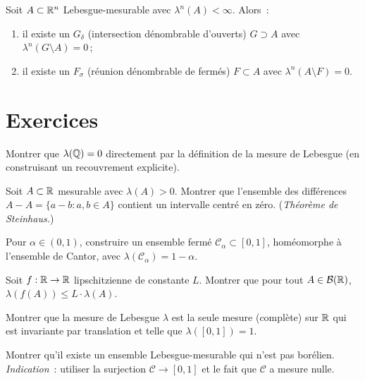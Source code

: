 \begin{theoreme}
Soit $A \subset \mathbb{R}^n$ Lebesgue-mesurable avec $\lambda^n(A) < \infty$. Alors~:
\begin{enumerate}
    \item il existe un $G_\delta$ (intersection d\'enombrable d'ouverts) $G \supset A$
    avec $\lambda^n(G \setminus A) = 0$\,;
    \item il existe un $F_\sigma$ (r\'eunion d\'enombrable de ferm\'es) $F \subset A$
    avec $\lambda^n(A \setminus F) = 0$.
\end{enumerate}
\end{theoreme}

\section{Exercices}

\begin{exercice}
Montrer que $\lambda(\mathbb{Q}) = 0$ directement par la d\'efinition de la mesure de
Lebesgue (en construisant un recouvrement explicite).
\end{exercice}

\begin{exercice}
Soit $A \subset \mathbb{R}$ mesurable avec $\lambda(A) > 0$. Montrer que l'ensemble des
diff\'erences $A - A = \{a - b : a, b \in A\}$ contient un intervalle centr\'e en
z\'ero. (\emph{Th\'eor\`eme de Steinhaus.})
\end{exercice}

\begin{exercice}
Pour $\alpha \in (0, 1)$, construire un ensemble ferm\'e $\mathcal{C}_\alpha
\subset [0, 1]$, hom\'eomorphe \`a l'ensemble de Cantor, avec
$\lambda(\mathcal{C}_\alpha) = 1 - \alpha$.
\end{exercice}

\begin{exercice}
Soit $f : \mathbb{R} \to \mathbb{R}$ lipschitzienne de constante $L$. Montrer que pour tout
$A \in \mathcal{B}(\mathbb{R})$, $\lambda(f(A)) \leq L \cdot \lambda(A)$.
\end{exercice}

\begin{exercice}
Montrer que la mesure de Lebesgue $\lambda$ est la seule mesure (compl\`ete) sur
$\mathbb{R}$ qui est invariante par translation et telle que $\lambda([0,1]) = 1$.
\end{exercice}

\begin{exercice}
Montrer qu'il existe un ensemble Lebesgue-mesurable qui n'est pas bor\'elien.
\emph{Indication}~: utiliser la surjection $\mathcal{C} \to [0,1]$ et le fait
que $\mathcal{C}$ a mesure nulle.
\end{exercice}
